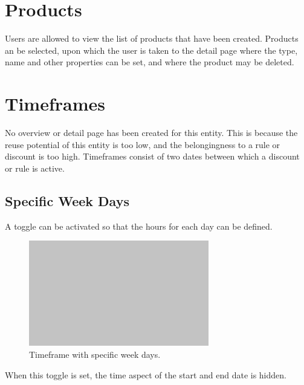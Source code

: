%
\section{Products}
Users are allowed to view the list of products that have been created. Products an be selected, upon which the user is taken to the detail page where the type, name and other properties can be set, and where the product may be deleted.

%
\section{Timeframes}
No overview or detail page has been created for this entity. This is because the reuse potential of this entity is too low, and the belongingness to a rule or discount is too high. Timeframes consist of two dates between which a discount or rule is active.

\subsection{Specific Week Days}
A toggle can be activated so that the hours for each day can be defined.

\begin{figure}[H]
	\centering
	\includegraphics[width=0.7\textwidth]{Blank}
	\caption[Timeframe Component]{Timeframe with specific week days.}
	\label{fig:Timeframe Component}
\end{figure}

When this toggle is set, the time aspect of the start and end date is hidden.

%
